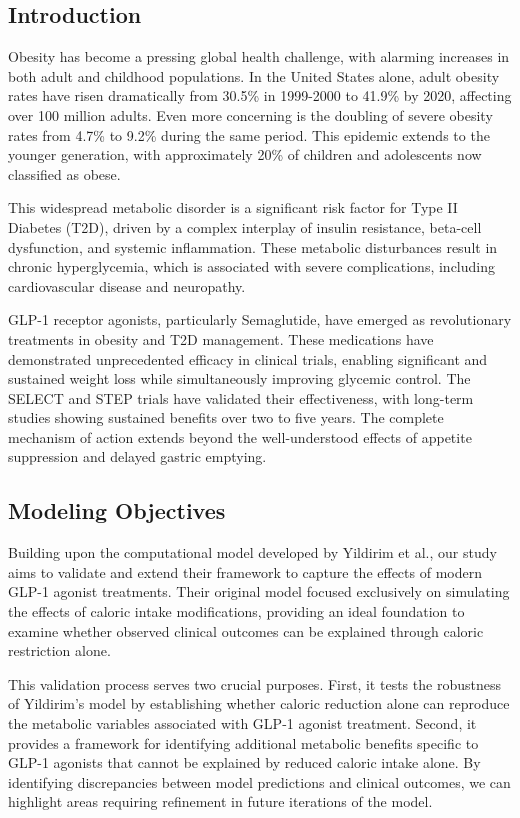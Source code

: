 \begin{multicols}{2}
\tableofcontents
\section{Introduction}
Obesity has become a pressing global health challenge, with alarming increases in both adult and childhood populations. In the United States alone, adult obesity rates have risen dramatically from 30.5\% in 1999-2000 to 41.9\% by 2020, affecting over 100 million adults. Even more concerning is the doubling of severe obesity rates from 4.7\% to 9.2\% during the same period. This epidemic extends to the younger generation, with approximately 20\% of children and adolescents now classified as obese\cite{CDC2024a,CDC2024b}.

This widespread metabolic disorder is a significant risk factor for Type II Diabetes (T2D), driven by a complex interplay of insulin resistance, beta-cell dysfunction, and systemic inflammation. These metabolic disturbances result in chronic hyperglycemia, which is associated with severe complications, including cardiovascular disease and neuropathy.

GLP-1 receptor agonists, particularly Semaglutide, have emerged as revolutionary treatments in obesity and T2D management. These medications have demonstrated unprecedented efficacy in clinical trials, enabling significant and sustained weight loss while simultaneously improving glycemic control. The SELECT and STEP trials have validated their effectiveness, with long-term studies showing sustained benefits over two to five years\cite{Garvey2022,Ryan2024}. The complete mechanism of action extends beyond the well-understood effects of appetite suppression and delayed gastric emptying.

\subsection{Modeling Objectives}
Building upon the computational model developed by Yildirim et al.\cite{Yildirim2023}, our study aims to validate and extend their framework to capture the effects of modern GLP-1 agonist treatments. Their original model focused exclusively on simulating the effects of caloric intake modifications, providing an ideal foundation to examine whether observed clinical outcomes can be explained through caloric restriction alone.

This validation process serves two crucial purposes. First, it tests the robustness of Yildirim's model by establishing whether caloric reduction alone can reproduce the metabolic variables associated with GLP-1 agonist treatment. Second, it provides a framework for identifying additional metabolic benefits specific to GLP-1 agonists that cannot be explained by reduced caloric intake alone. By identifying discrepancies between model predictions and clinical outcomes, we can highlight areas requiring refinement in future iterations of the model.
\end{multicols}